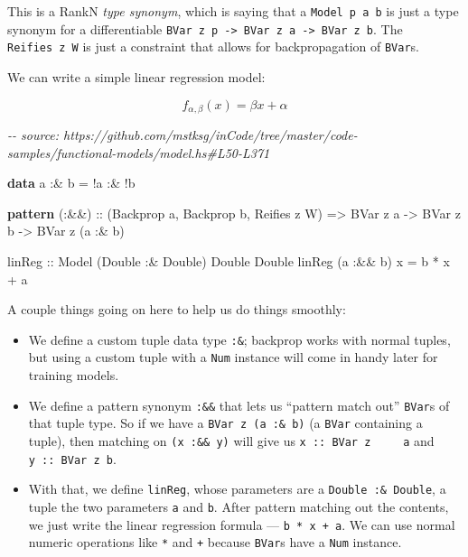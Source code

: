 \documentclass[]{article}
\newenvironment{Shaded}{}{}
\newcommand{\CommentTok}[1]{\textcolor[rgb]{0.38,0.63,0.69}{\textit{#1}}}
\newcommand{\DataTypeTok}[1]{\textcolor[rgb]{0.56,0.13,0.00}{#1}}
\newcommand{\KeywordTok}[1]{\textcolor[rgb]{0.00,0.44,0.13}{\textbf{#1}}}
\newcommand{\NormalTok}[1]{#1}
\newcommand{\OperatorTok}[1]{\textcolor[rgb]{0.40,0.40,0.40}{#1}}
\newcommand{\OtherTok}[1]{\textcolor[rgb]{0.00,0.44,0.13}{#1}}
\begin{document}
This is a RankN \emph{type synonym}, which is saying that a
\texttt{Model\ p\ a\ b} is just a type synonym for a differentiable
\texttt{BVar\ z\ p\ -\textgreater{}\ BVar\ z\ a\ -\textgreater{}\ BVar\ z\ b}.
The \texttt{Reifies\ z\ W} is just a constraint that allows for backpropagation
of \texttt{BVar}s.

We can write a simple linear regression model:

\[
f_{\alpha, \beta}(x) = \beta x + \alpha
\]

\begin{Shaded}
\begin{Highlighting}[]
\CommentTok{{-}{-} source: https://github.com/mstksg/inCode/tree/master/code{-}samples/functional{-}models/model.hs\#L50{-}L371}

\KeywordTok{data}\NormalTok{ a }\OperatorTok{:\&}\NormalTok{ b }\OtherTok{=} \OperatorTok{!}\NormalTok{a }\OperatorTok{:\&} \OperatorTok{!}\NormalTok{b}

\KeywordTok{pattern}\OtherTok{ (:\&\&) ::}\NormalTok{ (}\DataTypeTok{Backprop}\NormalTok{ a, }\DataTypeTok{Backprop}\NormalTok{ b, }\DataTypeTok{Reifies}\NormalTok{ z }\DataTypeTok{W}\NormalTok{)}
              \OtherTok{=\textgreater{}} \DataTypeTok{BVar}\NormalTok{ z a }\OtherTok{{-}\textgreater{}} \DataTypeTok{BVar}\NormalTok{ z b }\OtherTok{{-}\textgreater{}} \DataTypeTok{BVar}\NormalTok{ z (a }\OperatorTok{:\&}\NormalTok{ b)}

\OtherTok{linReg ::} \DataTypeTok{Model}\NormalTok{ (}\DataTypeTok{Double} \OperatorTok{:\&} \DataTypeTok{Double}\NormalTok{) }\DataTypeTok{Double} \DataTypeTok{Double}
\NormalTok{linReg (a }\OperatorTok{:\&\&}\NormalTok{ b) x }\OtherTok{=}\NormalTok{ b }\OperatorTok{*}\NormalTok{ x }\OperatorTok{+}\NormalTok{ a}
\end{Highlighting}
\end{Shaded}

A couple things going on here to help us do things smoothly:

\begin{itemize}
\item
  We define a custom tuple data type \texttt{:\&}; backprop works with normal
  tuples, but using a custom tuple with a \texttt{Num} instance will come in
  handy later for training models.
\item
  We define a pattern synonym \texttt{:\&\&} that lets us ``pattern match out''
  \texttt{BVar}s of that tuple type. So if we have a
  \texttt{BVar\ z\ (a\ :\&\ b)} (a \texttt{BVar} containing a tuple), then
  matching on \texttt{(x\ :\&\&\ y)} will give us
  \texttt{x\ ::\ BVar\ z\ \ \ \ \ a} and \texttt{y\ ::\ BVar\ z\ b}.
\item
  With that, we define \texttt{linReg}, whose parameters are a
  \texttt{Double\ :\&\ Double}, a tuple the two parameters \texttt{a} and
  \texttt{b}. After pattern matching out the contents, we just write the linear
  regression formula --- \texttt{b\ *\ x\ +\ a}. We can use normal numeric
  operations like \texttt{*} and \texttt{+} because \texttt{BVar}s have a
  \texttt{Num} instance.
\end{itemize}
\end{document}
